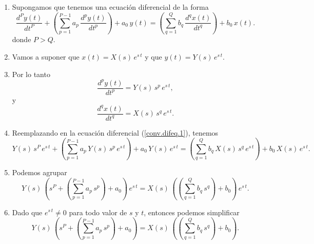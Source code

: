 \begin{enumerate}
	\item Supongamos que tenemos una ecuación diferencial de la forma
	\begin{equation}
		\frac{d^{P}y\left( t\right) }{dt^{P}} +
		\left(\sum_{p=1}^{P-1}a_{p} \, \frac{d^{p}y\left( t\right) }{dt^{p}}\right) + 
		a_{0} \, y(t) =
		\left(\sum_{q=1}^{Q}b_{q} \, \frac{d^{q}x\left( t\right) }{dt^{q}}\right) + 
		b_{0} \, x(t).
		\label{conv.difeq.1}
	\end{equation}
	donde $P > Q$.
	
	\item Vamos a suponer que $x(t) = X(s) \, e^{s \, t}$ y que $y(t) = Y(s) \, e^{s \, t}$.
	
	\item Por lo tanto
	\begin{equation}
		\frac{d^{p}y\left( t\right) }{dt^{p}} = Y(s) \, s^{p} \, e^{s \, t},
	\end{equation}
	y
	\begin{equation}
		\frac{d^{q}x\left( t\right) }{dt^{q}} = X(s) \, s^{q} \, e^{s \, t}.
	\end{equation}
	
	\item Reemplazando en la ecuación diferencial (\ref{conv.difeq.1}), tenemos
	\begin{equation}
		Y(s) \, s^{P} \, e^{s \, t} +
		\left(\sum_{p=1}^{P-1}a_{p} \, Y(s) \, s^{p} \, e^{s \, t}\right) + 
		a_{0} \, Y(s) \, e^{s \, t} =
		\left(\sum_{q=1}^{Q}b_{q} \, X(s) \, s^{q} \, e^{s \, t}\right) + 
		b_{0} \, X(s) \, e^{s \, t}.
		\label{conv.difeq.2}
	\end{equation}
	
	\item Podemos agrupar
	\begin{equation}
		Y(s) \, \left(s^{P}  +
		\left(\sum_{p=1}^{P-1}a_{p} \, s^{p}\right) + 
		a_{0} \right) \, e^{s \, t} =
		X(s) \, \left(\left(\sum_{q=1}^{Q}b_{q} \, s^{q}\right) + 
		b_{0} \right) \, e^{s \, t}.
		\label{conv.difeq.3}
	\end{equation}
	
	\item Dado que $e^{s \, t} \neq 0$ para todo valor de $s$ y $t$, entonces podemos simplificar
	\begin{equation}
		Y(s) \, \left(s^{P}  +
		\left(\sum_{p=1}^{P-1}a_{p} \, s^{p}\right) + 
		a_{0} \right) =
		X(s) \, \left(\left(\sum_{q=1}^{Q}b_{q} \, s^{q}\right) + 
		b_{0} \right).
		\label{conv.difeq.4}
	\end{equation}
	

\end{enumerate}
